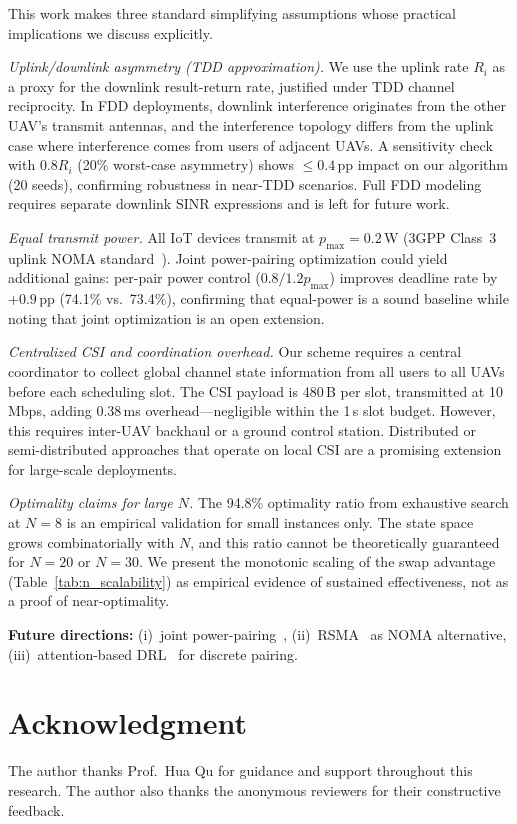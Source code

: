 \documentclass[journal]{IEEEtran}
\begin{document}
This work makes three standard simplifying assumptions whose practical implications we discuss explicitly.

\emph{Uplink/downlink asymmetry (TDD approximation).}
We use the uplink rate $R_i$ as a proxy for the downlink result-return rate, justified under TDD channel reciprocity. In FDD deployments, downlink interference originates from the other UAV's transmit antennas, and the interference topology differs from the uplink case where interference comes from users of adjacent UAVs. A sensitivity check with $0.8 R_i$ (20\% worst-case asymmetry) shows $\leq 0.4$\,pp impact on our algorithm (20 seeds), confirming robustness in near-TDD scenarios. Full FDD modeling requires separate downlink SINR expressions and is left for future work.

\emph{Equal transmit power.}
All IoT devices transmit at $p_{\max}=0.2$\,W (3GPP Class~3 uplink NOMA standard~\cite{saito2013non,di2017sub}). Joint power-pairing optimization could yield additional gains: per-pair power control ($0.8/1.2 p_{\max}$) improves deadline rate by $+0.9$\,pp (74.1\% vs.\ 73.4\%), confirming that equal-power is a sound baseline while noting that joint optimization is an open extension.

\emph{Centralized CSI and coordination overhead.}
Our scheme requires a central coordinator to collect global channel state information from all users to all UAVs before each scheduling slot. The CSI payload is 480\,B per slot, transmitted at 10\,Mbps, adding 0.38\,ms overhead---negligible within the 1\,s slot budget. However, this requires inter-UAV backhaul or a ground control station. Distributed or semi-distributed approaches that operate on local CSI are a promising extension for large-scale deployments.

\emph{Optimality claims for large $N$.}
The 94.8\% optimality ratio from exhaustive search at $N=8$ is an empirical validation for small instances only. The state space grows combinatorially with $N$, and this ratio cannot be theoretically guaranteed for $N=20$ or $N=30$. We present the monotonic scaling of the swap advantage (Table~\ref{tab:n_scalability}) as empirical evidence of sustained effectiveness, not as a proof of near-optimality.

\textbf{Future directions:} (i)~joint power-pairing~\cite{ali2016dynamic}, (ii)~RSMA~\cite{mao2022rate} as NOMA alternative, (iii)~attention-based DRL~\cite{kool2019attention} for discrete pairing.

\section*{Acknowledgment}
The author thanks Prof.\ Hua Qu for guidance and support throughout this research.
The author also thanks the anonymous reviewers for their constructive feedback.
\end{document}
